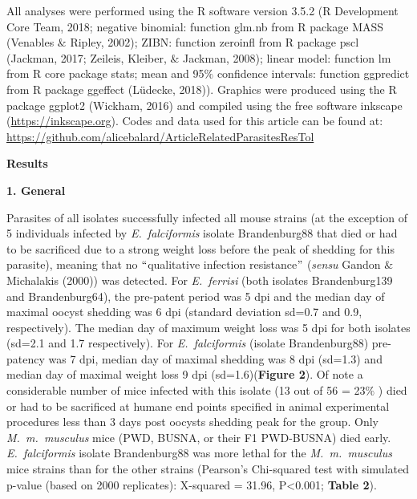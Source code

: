 \documentclass[12pt]{article}
\renewcommand{\_}{\kern-1.5pt\textunderscore\kern-1.5pt}
\begin{document}
All analyses were performed using the R software version 3.5.2 (R Development Core Team, 2018; negative binomial: function glm.nb from R package MASS (Venables $\&$  Ripley, 2002); ZIBN: function zeroinfl from R package pscl (Jackman, 2017; Zeileis, Kleiber, $\&$  Jackman, 2008); linear model: function lm from R core package stats; mean and 95$\%$  confidence intervals: function ggpredict from R package ggeffect (Lüdecke, 2018)). Graphics were prod\textcolor[HTML]{00000A}{uced using the R package ggplot2 (Wickham, 2016) and compiled using the free software inkscape (\href{https://inkscape.org/}{https://inkscape.org}). Codes and data used for this article can be found at: \href{https://github.com/alicebalard/Article_RelatedParasitesResTol}{https://github.com/alicebalard/Article\_RelatedParasitesResTol}}\par

{\fontsize{14pt}{16.8pt}\selectfont \textbf{Results}\par}\par

\begin{FlushLeft}
{\fontsize{14pt}{16.8pt}\selectfont \textbf{\textcolor[HTML]{CE181E}{1. General}}\par}
\end{FlushLeft}\par

Parasites of all isolates successfully infected all mouse strains \textcolor[HTML]{FF0000}{(at the exception of 5 individuals infected by \textit{E. falciformis} isolate Brandenburg88 that died or had to be sacrificed due to a strong weight loss before the peak of shedding for this parasite), meaning that no $``$qualitative infection resistance$"$  (\textit{sensu} Gandon $\&$  Michalakis (2000)) was detected}. For \textit{E. ferrisi }(both isolates \textcolor[HTML]{FF0000}{Brandenburg139 and Brandenburg64}), the pre-patent period was 5 dpi and the median day of maximal oocyst shedding was 6 dpi (standard deviation sd=0.7 and \textcolor[HTML]{FF0000}{0.9, respectively). The median day of maximum weight loss was 5 dpi for both isolates (sd=2.1 and 1.7 respectively).} For \textit{E. falciformis} (isolate Brandenburg88) pre-patency was 7 dpi, median day of maximal shedding was 8 dpi (sd=\textcolor[HTML]{FF0000}{1.3) and median day of maximal weight loss 9 dpi (sd=1.6)(\textbf{Figure}}\textbf{\textcolor[HTML]{FF0000}{ 2}}\textcolor[HTML]{FF0000}{). Of note a considerable number of mice infected with this isolate (13 out of 56 = 23$\%$ ) died or had to be sacrificed at humane end points specified in animal experimental procedures less than 3 days post oocysts shedding peak for the group. Only \textit{M. m. musculus} mice (PWD, BUSNA, or their F1 PWD-BUSNA) died early. \textit{E. falciformis }isolate Brandenburg88 was more lethal for the \textit{M. m. musculus} mice strains than for the other strains (Pearson's Chi-squared test with simulated p-value (based on 2000 replicates): X-squared = 31.96, P<0.001; \textbf{Table 2}).}\par
\end{document}

